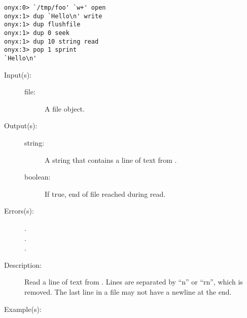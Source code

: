 \begin{description}
\begin{description}
\begin{verbatim}
onyx:0> `/tmp/foo' `w+' open
onyx:1> dup `Hello\n' write
onyx:1> dup flushfile
onyx:1> dup 0 seek
onyx:1> dup 10 string read
onyx:3> pop 1 sprint
`Hello\n'
		\end{verbatim}
	\end{description}
\label{systemdict:readline}
\item[{\onyxop{file}{readline}{string boolean}}: ]
	\begin{description}\item[]
	\item[Input(s): ]
		\begin{description}\item[]
		\item[file: ]
			A file object.
		\end{description}
	\item[Output(s): ]
		\begin{description}\item[]
		\item[string: ]
			A string that contains a line of text from .
		\item[boolean: ]
			If true, end of file reached during read.
		\end{description}
	\item[Errors(s): ]
		\begin{description}\item[]
		\item[.]
		\item[.]
		\item[.]
		\end{description}
	\item[Description: ]
		Read a line of text from .  Lines are separated
		by ``{\bs}n'' or ``{\bs}r{\bs}n'', which is removed.  The
		last line in a file may not have a newline at the end.
	\item[Example(s): ]\begin{verbatim}


\end{verbatim}
\end{description}
\end{description}
